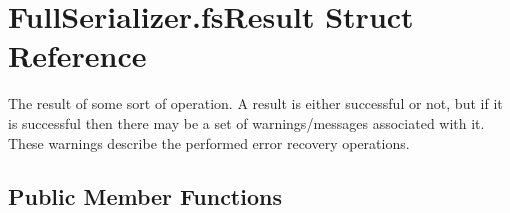 \hypertarget{struct_full_serializer_1_1fs_result}{}\section{Full\+Serializer.\+fs\+Result Struct Reference}
\label{struct_full_serializer_1_1fs_result}


The result of some sort of operation. A result is either successful or not, but if it is successful then there may be a set of warnings/messages associated with it. These warnings describe the performed error recovery operations.  


\subsection*{Public Member Functions}
